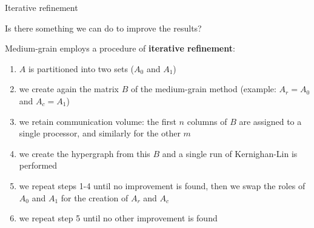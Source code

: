 \begin{frame}{Iterative refinement}
	\vspace{-0.2cm}

	Is there something we can do to improve the results?
	
	\vspace{0.2cm}

	Medium-grain employs a procedure of \textbf{iterative refinement}:

	\begin{enumerate}
		\item $A$ is partitioned into two sets ($A_0$ and $A_1$)
		\item we create again the matrix $B$ of the medium-grain method (example: $A_r = A_0$ and $A_c = A_1$)
		\item we retain communication volume: the first $n$ columns of $B$ are assigned to a single processor, and similarly for the other $m$
		\item we create the hypergraph from this $B$ and a single run of Kernighan-Lin is performed
		\item we repeat steps 1-4 until no improvement is found, then we swap the roles of $A_0$ and $A_1$ for the creation of $A_r$ and $A_c$
		\item we repeat step 5 until no other improvement is found
	\end{enumerate}

\end{frame}

